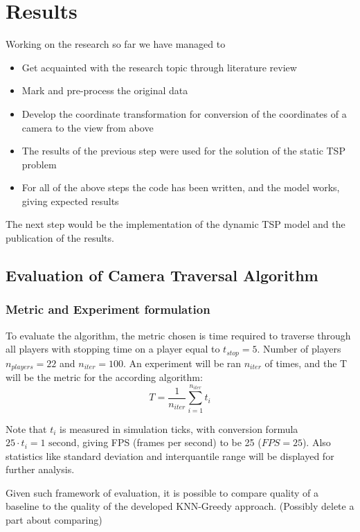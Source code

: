 \chapter{Results}

Working on the research so far we have managed to
\begin{itemize}
    \item Get acquainted with the research topic through literature review
    \item Mark and pre-process the original data
    \item Develop the coordinate transformation for conversion of the coordinates of a camera to the view from above
    \item The results of the previous step were used for the solution of the static TSP problem 
    \item For all of the above steps the code has been written, and the model works, giving expected results
\end{itemize}

The next step would be the implementation of the dynamic TSP model and the publication of the results.

\section{Evaluation of Camera Traversal Algorithm }
\subsection{Metric and Experiment formulation}
To evaluate the algorithm, the metric chosen is time required to traverse through all players with stopping time on a player equal to $t_{stop} = 5$. Number of players $n_{players} = 22$ and $n_{iter} = 100$. An experiment will be ran $n_{iter}$ of times, and the T will be the metric for the according algorithm:
$$
T=\frac{1}{n_{iter}}\sum\limits_{i=1}^{n_{iter}} t_{i}
$$

Note that $t_{i}$ is measured in simulation ticks, with conversion formula $25  \cdot t_{i} = 1 \text{ second}$, giving FPS (frames per second) to be 25 ($FPS=25$). Also statistics like standard deviation and interquantile range will be displayed for further analysis. 

Given such framework of evaluation, it is possible to compare quality of a baseline to the quality of the developed KNN-Greedy approach. {\color{purple}(Possibly delete a part about comparing)}

